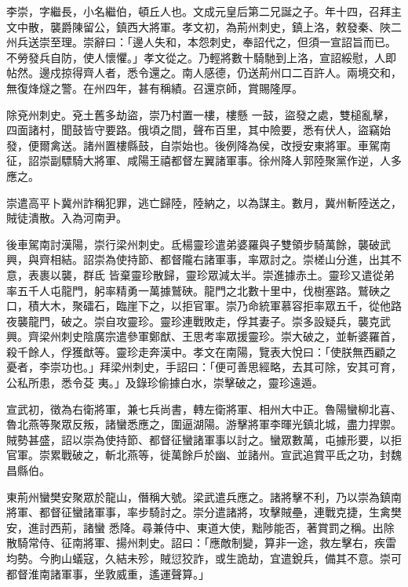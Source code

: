 \begin{pinyinscope}
 李崇，字繼長，小名繼伯，頓丘人也。文成元皇后第二兄誕之子。年十四，召拜主文中散，襲爵陳留公，鎮西大將軍。孝文初，為荊州刺史，鎮上洛，敕發秦、陜二州兵送崇至理。崇辭曰：「邊人失和，本怨刺史，奉詔代之，但須一宣詔旨而已。不勞發兵自防，使人懷懼。」孝文從之。乃輕將數十騎馳到上洛，宣詔綏慰，人即帖然。邊戍掠得齊人者，悉令還之。南人感德，仍送荊州口二百許人。兩境交和，無復烽燧之警。在州四年，甚有稱績。召還京師，賞賜隆厚。



 除兗州刺史。兗土舊多劫盜，崇乃村置一樓，樓懸
 一鼓，盜發之處，雙槌亂擊，四面諸村，聞鼓皆守要路。俄頃之間，聲布百里，其中險要，悉有伏人，盜竊始發，便爾禽送。諸州置樓縣鼓，自崇始也。後例降為侯，改授安東將軍。車駕南征，詔崇副驃騎大將軍、咸陽王禧都督左翼諸軍事。徐州降人郭陸聚黨作逆，人多應之。



 崇遣高平卜冀州詐稱犯罪，逃亡歸陸，陸納之，以為謀主。數月，冀州斬陸送之，賊徒潰散。入為河南尹。



 後車駕南討漢陽，崇行梁州刺史。氐楊靈珍遣弟婆羅與子雙領步騎萬餘，襲破武興，與齊相結。詔崇為使持節、都督隴右諸軍事，率眾討之。崇槎山分進，出其不意，表裹以襲，群氐
 皆棄靈珍散歸，靈珍眾減太半。崇進據赤土。靈珍又遣從弟率五千人屯龍門，躬率精勇一萬據鷲硤。龍門之北數十里中，伐樹塞路。鷲硤之口，積大木，聚礌石，臨崖下之，以拒官軍。崇乃命統軍慕容拒率眾五千，從他路夜襲龍門，破之。崇自攻靈珍。靈珍連戰敗走，俘其妻子。崇多設疑兵，襲克武興。齊梁州刺史陰廣宗遣參軍鄭猷、王思考率眾援靈珍。崇大破之，並斬婆羅首，殺千餘人，俘獲猷等。靈珍走奔漢中。孝文在南陽，覽表大悅曰：「使朕無西顧之憂者，李崇功也。」拜梁州刺史，手詔曰：「便可善思經略，去其可除，安其可育，公私所患，悉令芟
 夷。」及錄珍偷據白水，崇擊破之，靈珍遠遁。



 宣武初，徵為右衛將軍，兼七兵尚書，轉左衛將軍、相州大中正。魯陽蠻柳北喜、魯北燕等聚眾反叛，諸蠻悉應之，圍逼湖陽。游擊將軍李暉光鎮北城，盡力捍禦。賊勢甚盛，詔以崇為使持節、都督征蠻諸軍事以討之。蠻眾數萬，屯據形要，以拒官軍。崇累戰破之，斬北燕等，徙萬餘戶於幽、並諸州。宣武追賞平氐之功，封魏昌縣伯。



 東荊州蠻樊安聚眾於龍山，僭稱大號。梁武遣兵應之。諸將擊不利，乃以崇為鎮南將軍、都督征蠻諸軍事，率步騎討之。崇分遣諸將，攻擊賊壘，連戰克捷，生禽樊安，進討西荊，諸蠻
 悉降。尋兼侍中、東道大使，黜陟能否，著賞罰之稱。出除散騎常侍、征南將軍、揚州刺史。詔曰：「應敵制變，算非一途，救左擊右，疾雷均勢。今朐山蟻寇，久結未殄，賊愆狡詐，或生詭劫，宜遣銳兵，備其不意。崇可都督淮南諸軍事，坐敦威重，遙運聲算。」




\end{pinyinscope}
